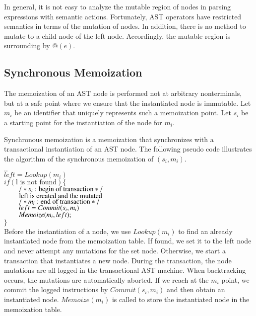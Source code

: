 \documentclass[JIP]{ipsj}
\begin{document}
In general, it is not easy to analyze the mutable region of nodes in parsing expressions with semantic actions. Fortunately, AST operators have restricted semantics in terms of the mutation of nodes. In addition, there is no method to mutate to a child node of the left node. Accordingly, the mutable region is surrounding by $@(e)$.

\subsection{Synchronous Memoization}

The memoization of an AST node is performed not at arbitrary nonterminals, but at a safe point where we ensure that the instantiated node is immutable. Let $m_i$ be an identifier that uniquely represents such a memoization point. Let $s_i$ be a starting point for the instantiation of the node for $m_i$. 

Synchronous memoization is a memoization that synchronizes with a transactional instantiation of an AST node. The following pseudo code illustrates the algorithm of the synchronous memoization of $(s_i, m_i)$. 

  $ .. $\\
  $left = Lookup(m_i)$ \\
  $if(\textrm{l is not found}) \{ $\\
  $\verb|    | /* s_i : \textrm{begin of transaction}*/$\\
  $\verb|    |\textrm{left is created and the mutated}$\\
  $\verb|    | /* m_i : \textrm{end of transaction} */$\\
  $\verb|    |left = Commit(s_i, m_i)$\\
  $\verb|    |Memoize(m_i, left);$ \\
  $\}$\\
  
Before the instantiation of a node, we use $Lookup(m_i)$ to find an already instantiated node from the memoization table. If found, we set it to the left node and never attempt any mutations for the set node. Otherwise, we start a transaction that instantiates a new node. During the transaction, the node mutations are all logged in the transactional AST machine. When backtracking occurs, the mutations are automatically aborted. If we reach at the $m_i$ point, we commit the logged instructions by $Commit(s_i, m_i)$ and then obtain an instantiated node. $Memoize(m_i)$ is called to store the instantiated node in the memoization table. 
\end{document}
